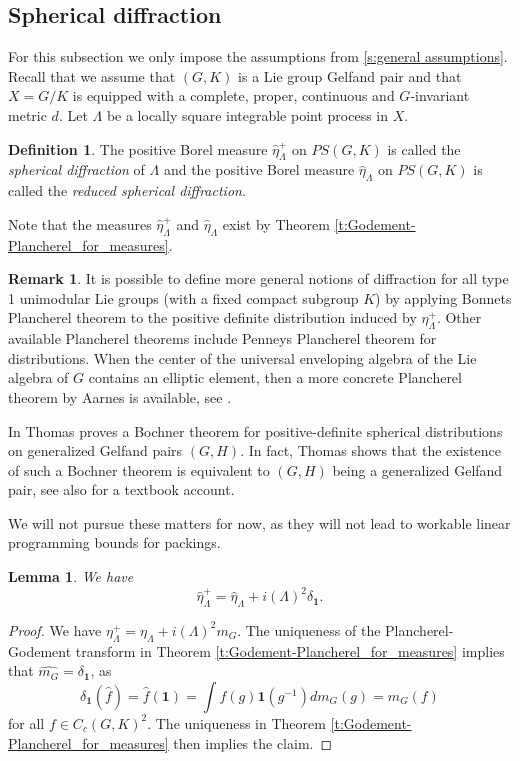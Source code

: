 \documentclass[12pt,reqno,a4paper]{amsart}
\theoremstyle{theorem}
\newtheorem{lemma}[theorem]{Lemma}
\theoremstyle{definition}
\newtheorem{definition}[theorem]{Definition}
\newtheorem{remark}[theorem]{Remark}
\numberwithin{theorem}{section}
\numberwithin{equation}{section}
\begin{document}
\subsection{Spherical diffraction}
For this subsection we only impose the assumptions from \ref{s:general assumptions}. Recall that we assume that $(G, K)$ is a Lie group Gelfand pair and that $X=G/K$ is equipped with a complete, proper, continuous and $G$-invariant metric $d$.
Let $\Lambda$ be a locally square integrable point process in $X$.
\begin{definition}
The positive Borel measure $\widehat{\eta}_\Lambda^+$ on $PS(G,K)$ is called the \emph{spherical diffraction} of $\Lambda$ and the positive Borel measure $\widehat{\eta}_\Lambda$ on $PS(G,K)$ is called the \emph{reduced spherical diffraction}.
\end{definition}
Note that the measures $\widehat{\eta}_\Lambda^+$ and $\widehat{\eta}_\Lambda$  exist by Theorem \ref{t:Godement-Plancherel_for_measures}.
\begin{remark}
	It is possible to define more general notions of diffraction for all type 1 unimodular Lie groups (with a fixed compact subgroup $K$) by applying Bonnets Plancherel theorem \cite{BonnetPlancherelTheorem} to the positive definite distribution induced by $\eta_\Lambda^+$. Other available Plancherel theorems include Penneys Plancherel theorem \cite{DistributionalPlancherelPenney} for distributions.
	When the center of the universal enveloping algebra of the Lie algebra of $G$ contains an elliptic element, then a more concrete Plancherel theorem by Aarnes is available, see \cite{EllipticCentralPlancherel}.
	
	In \cite{Thomas} Thomas proves a Bochner theorem for positive-definite spherical distributions on generalized Gelfand pairs $(G,H)$. In fact, Thomas shows that the existence of such a Bochner theorem is equivalent to $(G,H)$ being a generalized Gelfand pair, see also {\cite[Proposition 8.3.2]{vanDijk}} for a textbook account.
	
	We will not pursue these matters for now, as they will not lead to workable linear programming bounds for packings.
\end{remark}
\begin{lemma}\label{l:formula_diffraction_and_reduced_diffraction}
	We have
	\[\widehat{\eta}_\Lambda^+ = \widehat{\eta}_\Lambda + i(\Lambda)^2\delta_\mathbf{1}.\]
\end{lemma}
\begin{proof}
	We have $\eta_\Lambda^+ = \eta_\Lambda+i(\Lambda)^2m_G$. The uniqueness of the Plancherel-Godement transform in Theorem \ref{t:Godement-Plancherel_for_measures} implies that $\widehat{m_G} = \delta_\mathbf{1}$, as
	\[\delta_\mathbf{1}(\widehat{f}) = \widehat{f}(\mathbf{1}) = \int f(g)\mathbf{1}(g^{-1})dm_G(g) = m_G(f)\]
	for all $f\in C_c(G,K)^2$.
	The uniqueness in Theorem \ref{t:Godement-Plancherel_for_measures} then implies the claim.
\end{proof}
\end{document}
